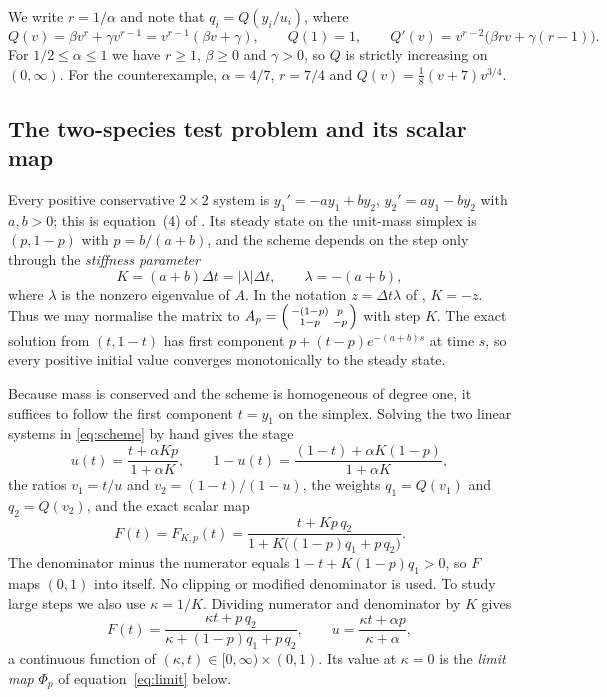 \documentclass[11pt,a4paper]{article}
\theoremstyle{plain}
\theoremstyle{definition}
\begin{document}
We write $r=1/\alpha$ and note that $q_i=Q(y_i/u_i)$, where
\begin{equation}\label{eq:Q}
 Q(v)=\beta v^{r}+\gamma v^{r-1}=v^{r-1}(\beta v+\gamma),\qquad
 Q(1)=1,\qquad Q'(v)=v^{r-2}\bigl(\beta r v+\gamma(r-1)\bigr).
\end{equation}
For $1/2\le\alpha\le1$ we have $r\ge1$, $\beta\ge0$ and $\gamma>0$, so $Q$ is strictly increasing on $(0,\infty)$. For the counterexample, $\alpha=4/7$, $r=7/4$ and $Q(v)=\frac18(v+7)v^{3/4}$.

\subsection{The two-species test problem and its scalar map}

Every positive conservative $2\times2$ system is $y_1'=-ay_1+by_2$, $y_2'=ay_1-by_2$ with $a,b>0$; this is equation~(4) of \cite{IKMS2024}. Its steady state on the unit-mass simplex is $(p,1-p)$ with $p=b/(a+b)$, and the scheme depends on the step only through the \emph{stiffness parameter}
\begin{equation}\label{eq:K}
 K=(a+b)\Delta t=|\lambda|\Delta t,\qquad \lambda=-(a+b),
\end{equation}
where $\lambda$ is the nonzero eigenvalue of $A$. In the notation $z=\Delta t\lambda$ of \cite{IKMS2024}, $K=-z$. Thus we may normalise the matrix to $A_p=\begin{psmallmatrix}-(1-p)&p\\1-p&-p\end{psmallmatrix}$ with step $K$. The exact solution from $(t,1-t)$ has first component $p+(t-p)e^{-(a+b)s}$ at time $s$, so every positive initial value converges monotonically to the steady state.

Because mass is conserved and the scheme is homogeneous of degree one, it suffices to follow the first component $t=y_1$ on the simplex. Solving the two linear systems in \eqref{eq:scheme} by hand gives the stage
\begin{equation}\label{eq:u}
 u(t)=\frac{t+\alpha Kp}{1+\alpha K},\qquad 1-u(t)=\frac{(1-t)+\alpha K(1-p)}{1+\alpha K},
\end{equation}
the ratios $v_1=t/u$ and $v_2=(1-t)/(1-u)$, the weights $q_1=Q(v_1)$ and $q_2=Q(v_2)$, and the exact scalar map
\begin{equation}\label{eq:map}
 F(t)=F_{K,p}(t)=\frac{t+Kp\,q_2}{1+K\bigl((1-p)q_1+p\,q_2\bigr)}.
\end{equation}
The denominator minus the numerator equals $1-t+K(1-p)q_1>0$, so $F$ maps $(0,1)$ into itself. No clipping or modified denominator is used. To study large steps we also use $\kappa=1/K$. Dividing numerator and denominator by $K$ gives
\begin{equation}\label{eq:mapkappa}
 F(t)=\frac{\kappa t+p\,q_2}{\kappa+(1-p)q_1+p\,q_2},\qquad u=\frac{\kappa t+\alpha p}{\kappa+\alpha},
\end{equation}
a continuous function of $(\kappa,t)\in[0,\infty)\times(0,1)$. Its value at $\kappa=0$ is the \emph{limit map} $\Phi_p$ of equation~\eqref{eq:limit} below.
\end{document}
